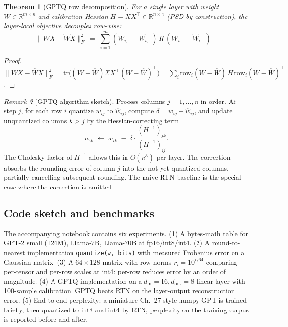 \documentclass[11pt]{article}
\newtheorem{theorem}{Theorem}[section]
\theoremstyle{remark}
\newtheorem{remark}[theorem]{Remark}
\begin{document}
\begin{theorem}[GPTQ row decomposition]\label{thm:gptq}
For a single layer with weight $W\in\mathbb{R}^{m\times n}$ and calibration Hessian $H = XX^\top \in \mathbb{R}^{n\times n}$ (PSD by construction), the layer-local objective decouples row-wise:
\[
\big\|WX-\widehat W X\big\|_F^2 \;=\; \sum_{i=1}^m (W_{i,:} - \widehat W_{i,:})\, H\, (W_{i,:} - \widehat W_{i,:})^\top.
\]
\end{theorem}

\begin{proof}
$\|WX - \widehat W X\|_F^2 = \mathrm{tr}\big((W-\widehat W)XX^\top(W-\widehat W)^\top\big) = \sum_i \mathrm{row}_i(W-\widehat W)\,H\,\mathrm{row}_i(W-\widehat W)^\top$.
\end{proof}

\begin{remark}[GPTQ algorithm sketch]
Process columns $j=1,\dots,n$ in order. At step $j$, for each row $i$ quantize $w_{ij}$ to $\widehat w_{ij}$, compute $\delta = w_{ij}-\widehat w_{ij}$, and update unquantized columns $k>j$ by the Hessian-correcting term
\[
w_{ik} \;\leftarrow\; w_{ik} \;-\; \delta\cdot \frac{(H^{-1})_{jk}}{(H^{-1})_{jj}}.
\]
The Cholesky factor of $H^{-1}$ allows this in $O(n^3)$ per layer. The correction absorbs the rounding error of column $j$ into the not-yet-quantized columns, partially cancelling subsequent rounding. The naive RTN baseline is the special case where the correction is omitted.
\end{remark}

\subsection*{Code sketch and benchmarks}

The accompanying notebook contains six experiments. (1) A bytes-math table for GPT-2 small (124M), Llama-7B, Llama-70B at fp16/int8/int4. (2) A round-to-nearest implementation \verb|quantize(w, bits)| with measured Frobenius error on a Gaussian matrix. (3) A $64\times 128$ matrix with row norms $r_i = 10^{i/64}$ comparing per-tensor and per-row scales at int4: per-row reduces error by an order of magnitude. (4) A GPTQ implementation on a $d_{\mathrm{in}}=16, d_{\mathrm{out}}=8$ linear layer with 100-sample calibration: GPTQ beats RTN on the layer-output reconstruction error. (5) End-to-end perplexity: a miniature Ch.~27-style numpy GPT is trained briefly, then quantized to int8 and int4 by RTN; perplexity on the training corpus is reported before and after.
\end{document}
